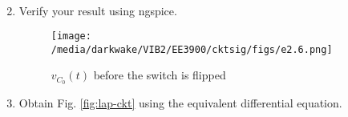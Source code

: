 \documentclass[journal,12pt,twocolumn]{IEEEtran}
\renewcommand\thesection{\arabic{section}}
\begin{document}
\begin{enumerate}[label=\arabic*.,ref=\thesection.\theenumi]
\begin{align}
\end{align}
\item Verify your result using ngspice.\\
\solution
\begin{figure}[!htb]
\texttt{[image: /media/darkwake/VIB2/EE3900/cktsig/figs/e2.6.png]}
\caption{$v_{C_0}(t)$ before the switch is flipped}
\label{fig:v1-t}
\end{figure}
\vspace{3cm}
\item Obtain Fig. 
\ref{fig:lap-ckt}
using the equivalent differential equation.
\end{enumerate}
\end{document}
